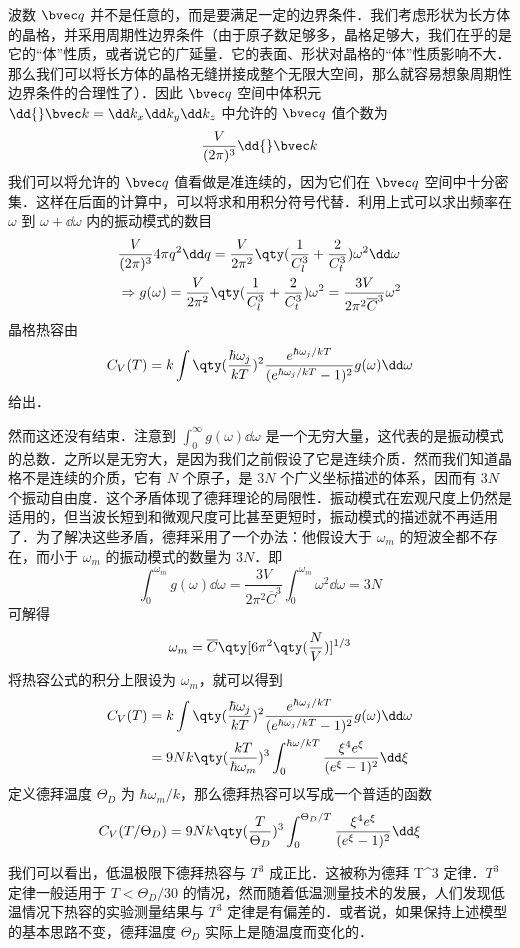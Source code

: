 波数 $\bvec q$ 并不是任意的，而是要满足一定的边界条件．我们考虑形状为长方体的晶格，并采用周期性边界条件（由于原子数足够多，晶格足够大，我们在乎的是它的“体”性质，或者说它的广延量．它的表面、形状对晶格的“体”性质影响不大．那么我们可以将长方体的晶格无缝拼接成整个无限大空间，那么就容易想象周期性边界条件的合理性了）．因此 $\bvec q$ 空间中体积元 $\dd{} \bvec k=\dd k_x\dd k_y\dd k_z$ 中允许的 $\bvec q$ 值个数为
\begin{equation}
\frac{V}{(2\pi)^3} \dd{} \bvec k
\end{equation}
我们可以将允许的 $\bvec q$ 值看做是准连续的，因为它们在 $\bvec q$ 空间中十分密集．这样在后面的计算中，可以将求和用积分符号代替．利用上式可以求出频率在 $\omega$ 到 $\omega+\dd \omega$ 内的振动模式的数目
\begin{equation}
\begin{aligned}
&\frac{V}{(2\pi)^3}4\pi q^2\dd q=\frac{V}{2\pi^2}\qty(\frac{1}{C_l^3}+\frac{2}{C_t^3})\omega^2\dd \omega\\
&\Rightarrow g(\omega)= \frac{V}{2\pi^2}\qty(\frac{1}{C_l^3}+\frac{2}{C_t^3}) \omega^2=\frac{3V}{2\pi^2 \overline C ^3} \omega^2
\end{aligned}
\end{equation}
晶格热容由
\begin{equation}
C_V(T)=k \int \qty(\frac{\hbar\omega_j}{kT})^2\frac{e^{\hbar \omega_j/kT}}{(e^{\hbar\omega_j/kT}-1)^2} g(\omega)\dd \omega
\end{equation}
给出．

然而这还没有结束．注意到 $\int_0^\infty g(\omega)\dd \omega$ 是一个无穷大量，这代表的是振动模式的总数．之所以是无穷大，是因为我们之前假设了它是连续介质．然而我们知道晶格不是连续的介质，它有 $N$ 个原子，是 $3N$ 个广义坐标描述的体系，因而有 $3N$ 个振动自由度．这个矛盾体现了德拜理论的局限性．振动模式在宏观尺度上仍然是适用的，但当波长短到和微观尺度可比甚至更短时，振动模式的描述就不再适用了．为了解决这些矛盾，德拜采用了一个办法：他假设大于 $\omega_m$ 的短波全都不存在，而小于 $\omega_m$ 的振动模式的数量为 $3N$．即
\begin{equation}
\int_0^{\omega_m} g(\omega)\dd \omega = \frac{3V}{2\pi^2\overline C^3}\int_0^{\omega_m}\omega^2\dd \omega =3N
\end{equation}
可解得
\begin{equation}
\omega_m = \overline C \qty[6\pi^2 \qty(\frac{N}{V})]^{1/3}
\end{equation}
将热容公式的积分上限设为 $\omega_m$，就可以得到
\begin{equation}
\begin{aligned}
C_V(T)&=k \int \qty(\frac{\hbar\omega_j}{kT})^2\frac{e^{\hbar \omega_j/kT}}{(e^{\hbar\omega_j/kT}-1)^2} g(\omega)\dd \omega\\
&=9Nk\qty(\frac{kT}{\hbar\omega_m})^3 \int_0^{\hbar\omega/kT} \frac{\xi^4 e^\xi}{(e^\xi-1)^2}\dd \xi
\end{aligned}
\end{equation}
定义德拜温度 $\Theta_D$ 为 $\hbar\omega_m/k$，那么德拜热容可以写成一个普适的函数
\begin{equation}
C_V(T/\Theta_D)=9Nk\qty(\frac{T}{\Theta_D})^3 \int_0^{\Theta_D/T}\frac{\xi^4 e^{\xi}}{(e^\xi-1)^2}\dd \xi
\end{equation}

我们可以看出，低温极限下德拜热容与 $T^3$ 成正比．这被称为德拜 T^3 定律．$T^3$ 定律一般适用于 $T<\Theta_D/30$ 的情况，然而随着低温测量技术的发展，人们发现低温情况下热容的实验测量结果与 $T^3$ 定律是有偏差的．或者说，如果保持上述模型的基本思路不变，德拜温度 $\Theta_D$ 实际上是随温度而变化的．
